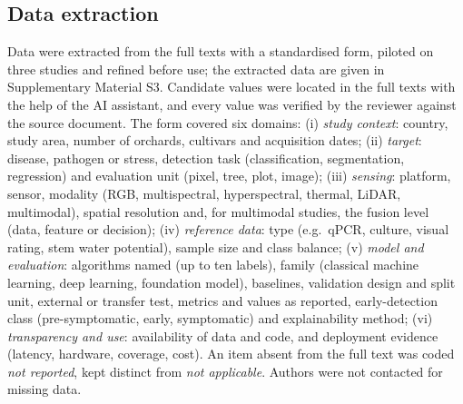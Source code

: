 \documentclass[preprint,12pt]{elsarticle}
\begin{document}
\subsection{Data extraction}\label{sec:extraction}
Data were extracted from the full texts with a standardised form, piloted on three studies and refined before use; the extracted data are given in Supplementary Material S3. Candidate values were located in the full texts with the help of the AI assistant, and every value was verified by the reviewer against the source document. The form covered six domains:
(i) \emph{study context}: country, study area, number of orchards, cultivars and acquisition dates;
(ii) \emph{target}: disease, pathogen or stress, detection task (classification, segmentation, regression) and evaluation unit (pixel, tree, plot, image);
(iii) \emph{sensing}: platform, sensor, modality (RGB, multispectral, hyperspectral, thermal, LiDAR, multimodal), spatial resolution and, for multimodal studies, the fusion level (data, feature or decision);
(iv) \emph{reference data}: type (e.g.\ qPCR, culture, visual rating, stem water potential), sample size and class balance;
(v) \emph{model and evaluation}: algorithms named (up to ten labels), family (classical machine learning, deep learning, foundation model), baselines, validation design and split unit, external or transfer test, metrics and values as reported, early-detection class (pre-symptomatic, early, symptomatic) and explainability method;
(vi) \emph{transparency and use}: availability of data and code, and deployment evidence (latency, hardware, coverage, cost).
An item absent from the full text was coded \emph{not reported}, kept distinct from \emph{not applicable}. Authors were not contacted for missing data.
 
\end{document}
